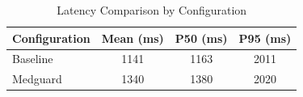 \begin{table}[h]
\centering
\begin{tabular}{lccc}
\toprule
Configuration & Mean (ms) & P50 (ms) & P95 (ms) \\
\midrule
Baseline & 1141 & 1163 & 2011 \\
Medguard & 1340 & 1380 & 2020 \\
\bottomrule
\end{tabular}
\caption{Latency Comparison by Configuration}
\label{tab:latency}
\end{table}
